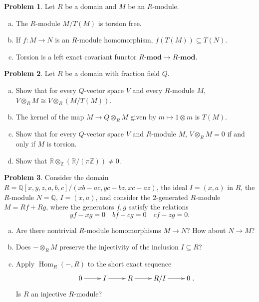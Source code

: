 \documentclass[11pt]{article}
\DeclareMathOperator{\Hom}{Hom}
\theoremstyle{definition}
\newtheorem{problem}{Problem}
\begin{document}
\vfill


\begin{problem} Let $R$ be a domain and $M$ be an $R$-module.
	\begin{enumerate}[a)]
		\item The $R$-module $M/T(M)$ is torsion free.
		\item If $f\!: M \longrightarrow N$ is an $R$-module homomorphism, $f(T(M)) \subseteq T(N)$.
		\item Torsion is a left exact covariant functor $R\textbf{-mod} \longrightarrow R\textbf{-mod}$.
	\end{enumerate}
\end{problem}

\vfill

\begin{problem}
	Let $R$ be a domain with fraction field $Q$.
	\begin{enumerate}[a)]
		\item Show that for every $Q$-vector space $V$ and every $R$-module $M$, $V \otimes_R M \cong V \otimes_R (M/T(M))$.
		\item The kernel of the map $M \longrightarrow Q \otimes_R M$ given by $m \mapsto 1 \otimes m$ is $T(M)$.		
		\item Show that for every $Q$-vector space $V$ and $R$-module $M$, $V \otimes_R M = 0$ if and only if $M$ is torsion.
		\item Show that $\mathbb{R} \otimes_\mathbb{Z} (\mathbb{R} / (\pi \mathbb{Z})) \neq 0$.
	\end{enumerate}
\end{problem}



\newpage

\begin{problem}
	Consider the domain $R = \mathbb{Q}[x,y,z,a,b,c]/(xb-ac,yc-bz,xc-az)$, the ideal $I = (x,a)$ in $R$, the $R$-module $N = \mathbb{Q}$, $I = (x,a)$, and consider the $2$-generated $R$-module $M = Rf + Rg$, where the generators $f, g$ satisfy the relations 
		$$yf-xg = 0 \quad bf - cg = 0 \quad cf - zg = 0.$$
			\begin{enumerate}[a)]
		\item Are there nontrivial $R$-module homomorphisms $M \longrightarrow N$? How about $N \longrightarrow M$?
		\item Does $- \otimes_R M$ preserve the injectivity of the inclusion $I \subseteq R$?
		\item Apply $\Hom_R(-,R)$ to the short exact sequence 
		$$\xymatrix{0 \ar[r] & I \ar[r] & R \ar[r] & R/I \ar[r] & 0}.$$
		Is $R$ an injective $R$-module?
		\end{enumerate}
\end{problem}
\end{document}
